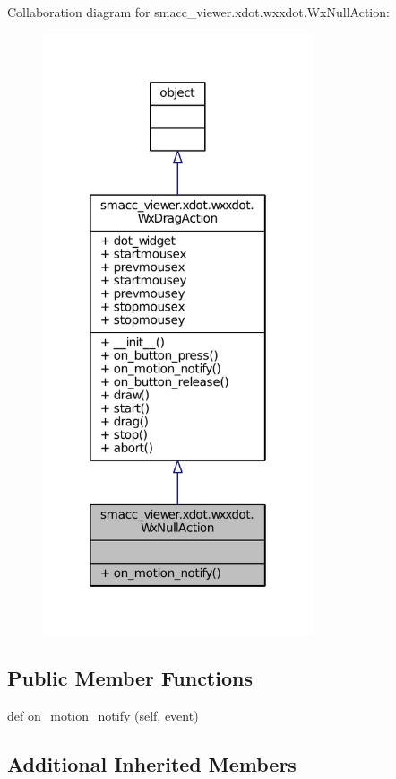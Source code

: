 Collaboration diagram for smacc\+\_\+viewer.\+xdot.\+wxxdot.\+Wx\+Null\+Action\+:
\nopagebreak
\begin{figure}[H]
\begin{center}
\leavevmode
\includegraphics[width=226pt]{classsmacc__viewer_1_1xdot_1_1wxxdot_1_1WxNullAction__coll__graph}
\end{center}
\end{figure}
\subsection*{Public Member Functions}
\begin{DoxyCompactItemize}
\item 
def \hyperlink{classsmacc__viewer_1_1xdot_1_1wxxdot_1_1WxNullAction_a89f162824c5a8b814ceec00b70d7db77}{on\+\_\+motion\+\_\+notify} (self, event)
\end{DoxyCompactItemize}
\subsection*{Additional Inherited Members}


